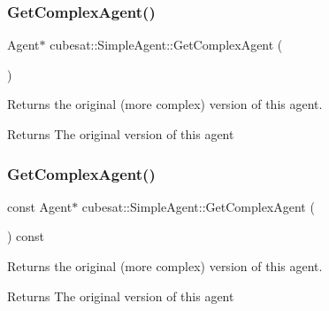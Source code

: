 \subsubsection{\texorpdfstring{Get\+Complex\+Agent()}{GetComplexAgent()}\hspace{0.1cm}{\footnotesize\ttfamily [1/2]}}
{\footnotesize\ttfamily Agent$\ast$ cubesat\+::\+Simple\+Agent\+::\+Get\+Complex\+Agent (\begin{DoxyParamCaption}{ }\end{DoxyParamCaption})\hspace{0.3cm}{\ttfamily [inline]}}



Returns the original (more complex) version of this agent. 

\begin{DoxyReturn}{Returns}
The original version of this agent 
\end{DoxyReturn}
\mbox{\label{classcubesat_1_1SimpleAgent_a4bf4f56ed4ad5c945db1085a95307b3f}} 
\subsubsection{\texorpdfstring{Get\+Complex\+Agent()}{GetComplexAgent()}\hspace{0.1cm}{\footnotesize\ttfamily [2/2]}}
{\footnotesize\ttfamily const Agent$\ast$ cubesat\+::\+Simple\+Agent\+::\+Get\+Complex\+Agent (\begin{DoxyParamCaption}{ }\end{DoxyParamCaption}) const\hspace{0.3cm}{\ttfamily [inline]}}



Returns the original (more complex) version of this agent. 

\begin{DoxyReturn}{Returns}
The original version of this agent 
\end{DoxyReturn}
\mbox{\label{classcubesat_1_1SimpleAgent_a3fa7d4df2b024aed0c1336ca2c3e9f7c}} 

